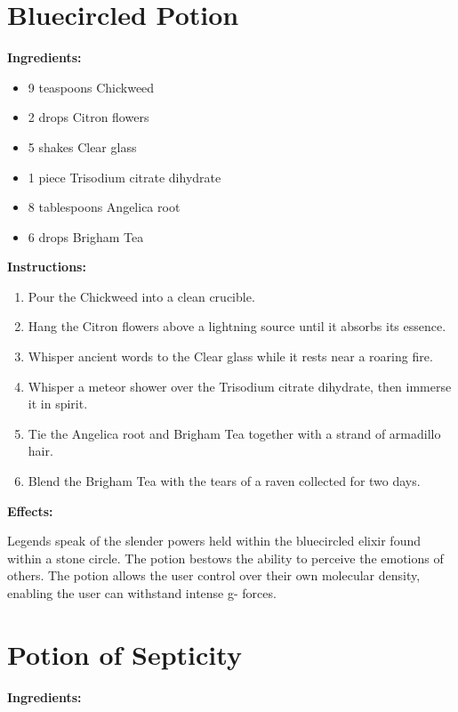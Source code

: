 \documentclass{article}
\begin{document}
\newpage
\section*{Bluecircled Potion}

\textbf{Ingredients:}

\begin{itemize}
  \item 9 teaspoons Chickweed
  \item 2 drops Citron flowers
  \item 5 shakes Clear glass
  \item 1 piece Trisodium citrate dihydrate
  \item 8 tablespoons Angelica root
  \item 6 drops Brigham Tea
\end{itemize}

\textbf{Instructions:}

\begin{enumerate}
  \item Pour the Chickweed into a clean crucible.
  \item Hang the Citron flowers above a lightning source until it absorbs its essence.
  \item Whisper ancient words to the Clear glass while it rests near a roaring fire.
  \item Whisper a meteor shower over the Trisodium citrate dihydrate, then immerse it in spirit.
  \item Tie the Angelica root and Brigham Tea together with a strand of armadillo hair.
  \item Blend the Brigham Tea with the tears of a raven collected for two days.
\end{enumerate}

\textbf{Effects:}

Legends speak of the slender powers held within the bluecircled elixir found within a stone circle. The potion bestows the ability to perceive the emotions of others. The potion allows the user control over their own molecular density, enabling the user can withstand intense g- forces.

\newpage
\section*{Potion of Septicity}

\textbf{Ingredients:}
\end{document}
